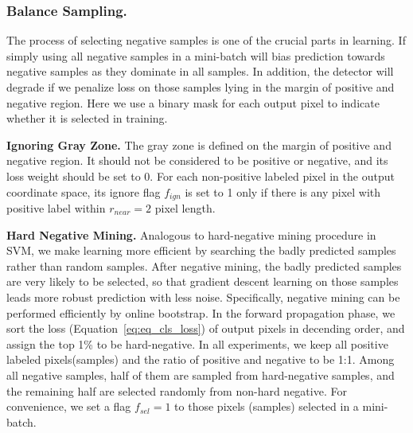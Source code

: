  \subsubsection{Balance Sampling.} 
The process of selecting negative samples is one of the crucial parts in learning. If simply using all negative samples in a mini-batch will bias prediction towards negative samples as they dominate in all samples.  In addition, the detector will degrade if we penalize loss on those samples lying in the margin of positive and negative region.  Here we use a binary mask for each output pixel to indicate whether it is selected in training. 

\textbf{Ignoring Gray Zone.} 
The gray zone is defined on the margin of positive and negative region. It should not be considered to be positive or negative, and its loss weight should be set to $0$.  For each non-positive labeled pixel in the output coordinate space, its ignore flag $f_{ign}$ is set to 1 only if there is any pixel with positive label within $r_{near} = 2$ pixel length.  

\textbf{Hard Negative Mining.} 
Analogous to hard-negative mining procedure in SVM, we make learning more efficient by searching the badly predicted samples rather than random samples. After negative mining, the badly predicted samples are very likely to be selected, so that gradient descent learning on those samples leads more robust prediction with less noise. Specifically, negative mining can be performed efficiently by online bootstrap. In the forward propagation phase, we sort the loss (Equation~\ref{eq:eq_cls_loss}) of output pixels in decending order, and assign the top 1\% to be hard-negative.   In all experiments, we keep all positive labeled pixels(samples) and the ratio of positive and negative to be 1:1.  Among all negative samples, half of them are sampled from hard-negative samples, and the remaining half are selected randomly from non-hard negative. For convenience, we set a flag $f_{sel} = 1$ to those pixels (samples) selected in a mini-batch. 

